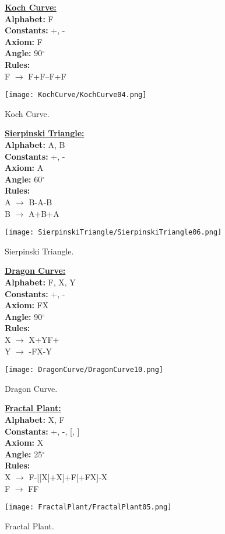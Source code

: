 \begin{figure}[htbp]
	\raggedright
	\textbf{\underline{Koch Curve:}} \\
	\textbf{Alphabet:} F \\
	\textbf{Constants:} +, - \\
	\textbf{Axiom:} F \\
	\textbf{Angle:} 90$^\circ$ \\
	\textbf{Rules:} \\
	F $\rightarrow$ F+F--F+F\\
	{\centering
		\vspace{7px}
		\texttt{[image: KochCurve/KochCurve04.png]}
		\caption{Koch Curve.}
	}
\end{figure}
\begin{figure}[htbp]
	\raggedright
	\textbf{\underline{Sierpinski Triangle:}} \\
	\textbf{Alphabet:} A, B \\
	\textbf{Constants:} +, - \\
	\textbf{Axiom:} A \\
	\textbf{Angle:} 60$^\circ$ \\
	\textbf{Rules:} \\
	A $\rightarrow$  B-A-B \\
	B $\rightarrow$ A+B+A\\
	{\centering
		\vspace{7px}
		\texttt{[image: SierpinskiTriangle/SierpinskiTriangle06.png]}
		\caption{Sierpinski Triangle.}
	}
\end{figure}
\begin{figure}[htbp]
	\raggedright
	\textbf{\underline{Dragon Curve:}} \\
	\textbf{Alphabet:} F, X, Y \\
	\textbf{Constants:} +, - \\
	\textbf{Axiom:} FX \\
	\textbf{Angle:} 90$^\circ$ \\
	\textbf{Rules:} \\
	X $\rightarrow$ X+YF+ \\
	Y $\rightarrow$ -FX-Y\\
	{\centering
		\vspace{7px}
		\texttt{[image: DragonCurve/DragonCurve10.png]}
		\caption{Dragon Curve.}
	}
\end{figure}
\begin{figure}[htbp]
	\raggedright
	\textbf{\underline{Fractal Plant:}} \\
	\textbf{Alphabet:} X, F\\
	\textbf{Constants:} +, -, [, ] \\
	\textbf{Axiom:} X \\
	\textbf{Angle:} 25$^\circ$ \\
	\textbf{Rules:} \\
	X $\rightarrow$ F-[[X]+X]+F[+FX]-X\\
	F $\rightarrow$ FF \\
	{\centering
		\vspace{7px}
		\texttt{[image: FractalPlant/FractalPlant05.png]}
		\caption{Fractal Plant.}
	}
\end{figure}
